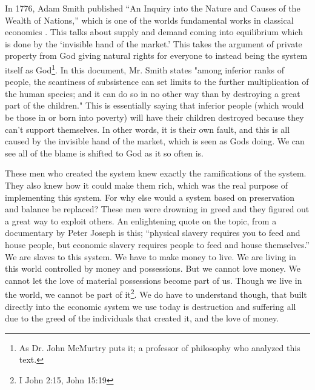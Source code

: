 \documentclass[11pt]{article}
\begin{document}
\begin{multicols}{2}
In 1776, Adam Smith published ``An Inquiry into the Nature and Causes of the Wealth of Nations,” which is one of the worlds fundamental works in classical economics \cite{WealthofNations}. This talks about supply and demand coming into equilibrium which is done by the ‘invisible hand of the market.’ This takes the argument of private property from God giving natural rights for everyone to instead being the system itself as God\footnote{As Dr. John McMurtry puts it; a professor of philosophy who analyzed this text.}. In this document, Mr. Smith states "among inferior ranks of people, the scantiness of subsistence can set limits to the further multiplication of the human species; and it can do so in no other way than by destroying a great part of the children." This is essentially saying that inferior people (which would be those in or born into poverty) will have their children destroyed because they can't support themselves. In other words, it is their own fault, and this is all caused by the invisible hand of the market, which is seen as Gods doing. We can see all of the blame is shifted to God as it so often is. 

These men who created the system knew exactly the ramifications of the system. They also knew how it could make them rich, which was the real purpose of implementing this system. For why else would a system based on preservation and balance be replaced? These men were drowning in greed and they figured out a great way to exploit others. An enlightening quote on the topic, from a documentary by Peter Joseph is this; ``physical slavery requires you to feed and house people, but economic slavery requires people to feed and house themselves.” We are slaves to this system. We have to make money to live. We are living in this world controlled by money and possessions. But we cannot love money. We cannot let the love of material possessions become part of us. Though we live in the world, we cannot be part of it\footnote{I John 2:15, John 15:19}. We do have to understand though, that built directly into the economic system we use today is destruction and suffering all due to the greed of the individuals that created it, and the love of money.


\end{multicols}
\end{document}
